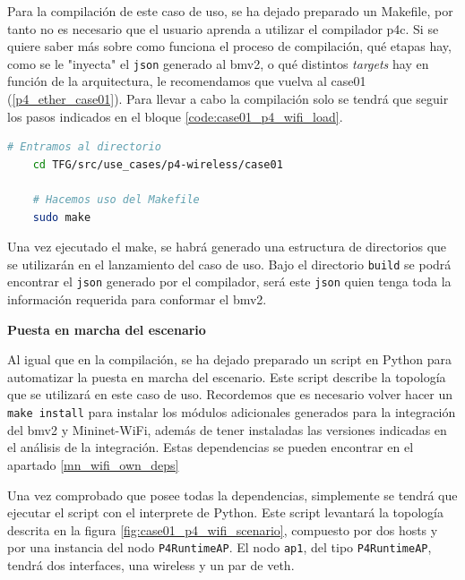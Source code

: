 Para la compilación de este caso de uso, se ha dejado preparado un Makefile, por tanto no es necesario que el usuario aprenda a utilizar el compilador p4c. Si se quiere saber más sobre como funciona el proceso de compilación, qué etapas hay, como se le "inyecta" el \texttt{json} generado al \gls{bmv2}, o qué distintos \textit{targets} hay en función de la arquitectura, le recomendamos que vuelva al case01 (\ref{p4_ether_case01}). Para llevar a cabo la compilación solo se tendrá que seguir los pasos indicados en el bloque \ref{code:case01_p4_wifi_load}.

\begin{lstlisting}[language= bash, style=Consola, caption={Compilación programa P4  - Case01},label=code:case01_p4_wifi_load]
    # Entramos al directorio 
    cd TFG/src/use_cases/p4-wireless/case01

    # Hacemos uso del Makefile
    sudo make
\end{lstlisting}
\vspace{0.5cm}


Una vez ejecutado el make, se habrá generado una estructura de directorios que se utilizarán en el lanzamiento del caso de uso. Bajo el directorio \texttt{build} se podrá encontrar el \texttt{json} generado por el compilador, será este \texttt{json} quien tenga toda la información requerida para conformar el \gls{bmv2}.\\
\par

\vspace{0.2cm}
\textbf{Puesta en marcha del escenario}\\
\par

Al igual que en la compilación, se ha dejado preparado un script en Python para automatizar la puesta en marcha del escenario. Este script describe la topología que se utilizará en este caso de uso. Recordemos que es necesario volver hacer un \texttt{make install} para instalar los módulos adicionales generados para la integración del \gls{bmv2} y Mininet-WiFi, además de tener instaladas las versiones indicadas en el análisis de la integración. Estas dependencias se pueden encontrar en el apartado \ref{mn_wifi_own_deps} \\
\par

Una vez comprobado que posee todas la dependencias, simplemente se tendrá que ejecutar el script con el interprete de Python. Este script levantará la topología descrita en la figura \ref{fig:case01_p4_wifi_scenario}, compuesto por dos hosts y por una instancia del nodo \texttt{P4RuntimeAP}. El nodo \texttt{ap1}, del tipo \texttt{P4RuntimeAP}, tendrá dos interfaces, una wireless y un par de \gls{veth}.



